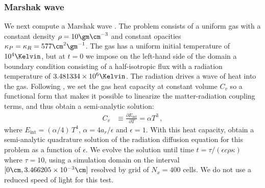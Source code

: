 \documentclass[fleqn,usenatbib]{mnras}
\begin{document}
\subsubsection{Marshak wave}
We next compute a Marshak wave \citep{Marshak_1958}. The problem consists of a uniform gas with a constant density $\rho = 10 \gm \cm^{-3}$ and constant opacities $\kappa_P = \kappa_R = 577 \cm^{2} \gm^{-1}$. The gas has a uniform initial temperature of $10^4 \Kelvin$, but at $t=0$ we impose on the left-hand side of the domain a boundary condition consisting of a half-isotropic flux with a radiation temperature of $3.481334 \times 10^6 \Kelvin$. The radiation drives a wave of heat into the gas. Following \cite{Su_1996}, we set the gas heat capacity at constant volume $C_v$ so a functional form that makes it possible to linearize the matter-radiation coupling terms, and thus obtain a semi-analytic solution:
\begin{align}
C_v &\equiv \frac{\partial E_{\text{int}}}{\partial T} = \alpha T^3 \, ,
\label{eq:heat_capacity}
\end{align}
where $E_{\text{int}} = (\alpha / 4) \, T^4$, $\alpha = 4 a_r / \epsilon$ and $\epsilon = 1$. With this heat capacity, \cite{Su_1996} obtain a semi-analytic quadrature solution of the radiation diffusion equation for this problem as a function of $\epsilon$. We evolve the solution until time $t = \tau / (\epsilon c \rho \kappa)$ where $\tau = 10$, using a simulation domain on the interval $[0 \cm, 3.466205 \times 10^{-3}\cm]$ resolved by grid of $N_x = 400$ cells. We do not use a reduced speed of light for this test.
\end{document}
